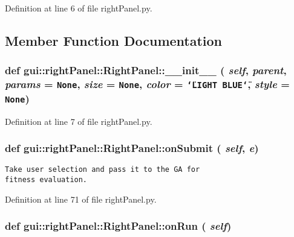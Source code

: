 Definition at line 6 of file rightPanel.py.

\subsection{Member Function Documentation}
\subsubsection{\setlength{\rightskip}{0pt plus 5cm}def gui::rightPanel::RightPanel::\_\-\_\-init\_\-\_\- ( {\em self},  {\em parent},  {\em params} = {\tt None},  {\em size} = {\tt None},  {\em color} = {\tt \char`\"{}LIGHT~BLUE\char`\"{}},  {\em style} = {\tt None})}\label{classgui_1_1rightPanel_1_1RightPanel_b8cdef9c41f92481f115c41e5f4448d3}




Definition at line 7 of file rightPanel.py.
\subsubsection{\setlength{\rightskip}{0pt plus 5cm}def gui::rightPanel::RightPanel::onSubmit ( {\em self},  {\em e})}\label{classgui_1_1rightPanel_1_1RightPanel_d919a4731993690138b3dc502ee102b9}




\footnotesize\begin{verbatim}
Take user selection and pass it to the GA for 
fitness evaluation.
\end{verbatim}
\normalsize
 

Definition at line 71 of file rightPanel.py.
\subsubsection{\setlength{\rightskip}{0pt plus 5cm}def gui::rightPanel::RightPanel::onRun ( {\em self})}\label{classgui_1_1rightPanel_1_1RightPanel_d48af3d4e2c029d6231f40945aa85426}




